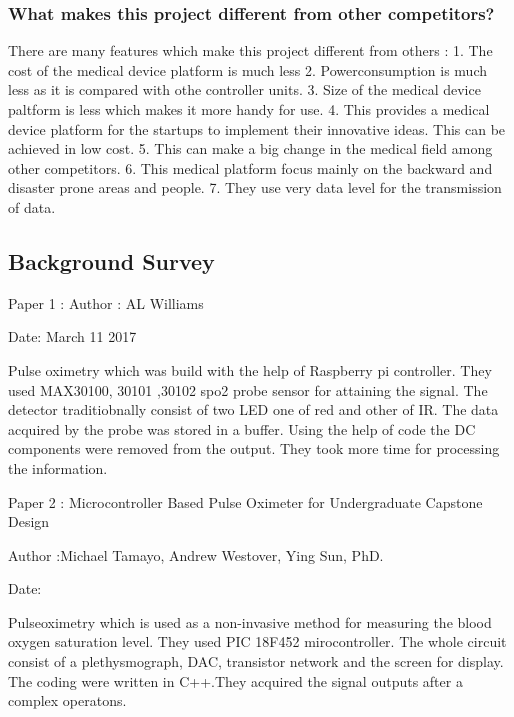 
\subsubsection{What makes this project different from other competitors?}

There are many features which make this project different from others :
1. The cost of the medical device platform is much less
2. Powerconsumption is much less as it is compared with othe controller units.
3. Size of the medical device paltform is less which makes it more handy for use.
4. This provides a medical device platform for the startups to implement their innovative ideas. This can be achieved in low cost.
5. This can make a big change in the medical field among other competitors.
6. This medical platform focus mainly on the backward and disaster prone areas and people.
7. They use very data level for the transmission of data.   


\subsection{Background Survey}

Paper 1 : 
Author  : AL Williams  

Date: March 11 2017 
 
Pulse oximetry which was build with the help of Raspberry pi controller. They used MAX30100, 30101 ,30102  spo2 probe sensor for attaining the signal. The detector traditiobnally consist of two LED one of red and other of IR. 
The data acquired by the probe was stored in a buffer. Using the help of code the DC components were removed from the output. 
They took more time for processing the information. 

Paper 2 :  Microcontroller Based Pulse Oximeter for Undergraduate Capstone Design \cite{tamayo2010microcontroller}

Author  :Michael Tamayo, Andrew Westover, Ying Sun, PhD.

Date: 

Pulseoximetry which is used as a non-invasive method for measuring the blood oxygen saturation level. They used PIC 18F452  mirocontroller. The whole circuit consist of a plethysmograph, DAC, transistor network and the screen for display. The coding were written in C++.They acquired the signal outputs after a complex operatons.  

